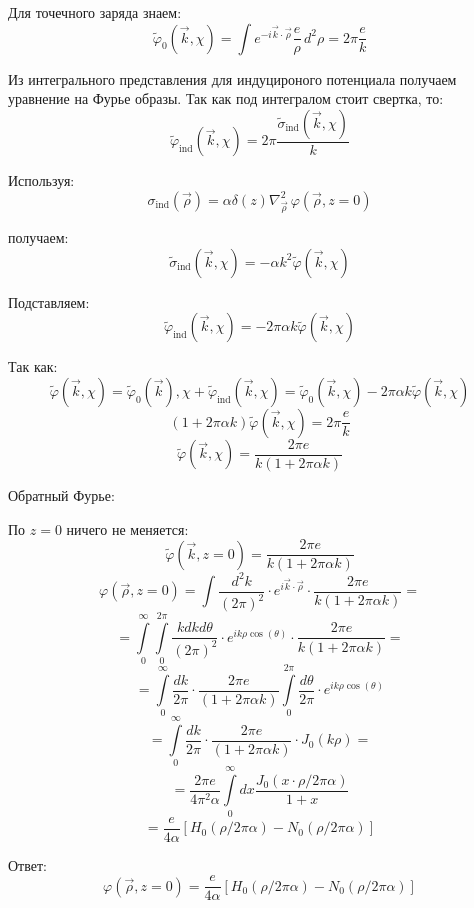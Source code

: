 \documentclass[12pt]{article}
\begin{document}
\begin{large}
\par Для точечного заряда знаем:
\[
    \tilde{\varphi}_0(\vec{k}, \chi) = \int e^{-i \vec{k} \cdot \vec{\rho}} \frac{e}{\rho} \, d^2 \rho = 2\pi \frac{e}{k}
\]
\par Из интегрального представления для индуцироного потенциала получаем уравнение на Фурье образы. Так как под интегралом стоит свертка, то:
\[
    \tilde{\varphi}_{\text{ind}}(\vec{k}, \chi) = 2\pi \frac{\tilde{\sigma}_{\text{ind}}(\vec{k}, \chi)}{k}
\]
\par Используя:
\[
    \sigma_{\text{ind}}(\vec{\rho}) = \alpha \delta(z) \nabla_{\vec{\rho}}^2 \, \varphi(\vec{\rho}, z = 0)
\]
\par получаем:
\[
\tilde{\sigma}_{\text{ind}}(\vec{k}, \chi) = -\alpha k^2 \tilde{\varphi}(\vec{k}, \chi)
\]
\par Подставляем:
\[
    \tilde{\varphi}_{\text{ind}}(\vec{k}, \chi) = -2\pi \alpha k \tilde{\varphi}(\vec{k}, \chi)
\]
\par Так как:
\[
\tilde{\varphi}(\vec{k}, \chi) = \tilde{\varphi}_0(\vec{k}), \chi + \tilde{\varphi}_{\text{ind}}(\vec{k}, \chi) = \tilde{\varphi}_0(\vec{k}, \chi) - 2\pi \alpha k \tilde{\varphi}(\vec{k}, \chi)
\]
\[
\left(1 + 2\pi \alpha k\right) \tilde{\varphi}(\vec{k}, \chi) = 2\pi \frac{e}{k}
\]
\[
\tilde{\varphi}(\vec{k}, \chi) = \frac{2\pi e}{k \left(1 + 2\pi \alpha k\right)}
\]

\par Обратный Фурье:
\par По $z = 0$ ничего не меняется:
\[
    \tilde{\varphi}(\vec{k}, z = 0) = \frac{2\pi e}{k \left(1 + 2\pi \alpha k\right)}
\]
\[
    \varphi(\vec{\rho}, z = 0) = \int \frac{d^2 k}{(2\pi)^2} \cdot e^{i \vec{k} \cdot \vec{\rho}} \cdot \frac{2\pi e}{k \left(1 + 2\pi \alpha k\right)} =
\]
\[
    = \int\limits_0^{ \infty} \int\limits_0^{ 2\pi} \frac{k dk d \theta}{(2\pi)^2} \cdot e^{i k \rho \cos(\theta)} \cdot \frac{2\pi e}{k \left(1 + 2\pi \alpha k\right)} =
\]
\[
    = \int\limits_0^{ \infty} \frac{dk}{2\pi} \cdot \frac{2\pi e}{\left(1 + 2\pi \alpha k\right)} \int\limits_0^{ 2\pi} \frac{d \theta}{2\pi} \cdot e^{i k \rho \cos(\theta)}
\]
\[
    = \int\limits_0^{ \infty} \frac{dk}{2\pi} \cdot \frac{2\pi e}{\left(1 + 2\pi \alpha k\right)} \cdot J_0(k \rho) =
\]
\[
    = \frac{2\pi e}{4 \pi^2 \alpha} \int\limits_0^{ \infty} dx \frac{J_0(x \cdot \rho/2\pi\alpha)}{1 + x}
\]
\[
    = \frac{e}{4\alpha} \left[ H_0(\rho/2\pi\alpha) - N_0(\rho/2\pi\alpha) \right]
\]
\par Ответ:
\[
    \varphi(\vec{\rho}, z = 0) = \frac{e}{4\alpha} \left[ H_0(\rho/2\pi\alpha) - N_0(\rho/2\pi\alpha) \right]
\]
\end{large}
\end{document}
